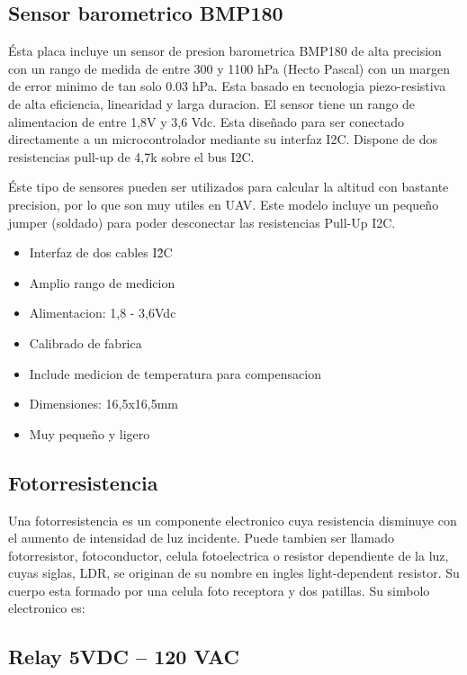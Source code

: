 \documentclass{article}
\begin{document}
\subsection{Sensor barometrico BMP180}

Ésta placa incluye un sensor de presion barometrica BMP180 de alta precision con un rango de medida de entre 300 y 1100 hPa (Hecto Pascal) con un margen de error minimo de tan solo 0.03 hPa. Esta basado en tecnologia piezo-resistiva de alta eficiencia, linearidad y larga duracion. El sensor tiene un rango de alimentacion de entre 1,8V y 3,6 Vdc. Esta diseñado para ser conectado directamente a un microcontrolador mediante su interfaz I2C. Dispone de dos resistencias pull-up de 4,7k sobre el bus I2C.

Éste tipo de sensores pueden ser utilizados para calcular la altitud con bastante precision, por lo que son muy utiles en UAV. Este modelo incluye un pequeño jumper (soldado) para poder desconectar las resistencias Pull-Up I2C.

\begin{itemize}
	\item Interfaz de dos cables I\^2C
	\item Amplio rango de medicion
	\item Alimentacion: 1,8 - 3,6Vdc
	\item Calibrado de fabrica
	\item Include medicion de temperatura para compensacion
	\item Dimensiones: 16,5x16,5mm
	\item Muy pequeño y ligero
\end{itemize}

\subsection{Fotorresistencia}

Una fotorresistencia es un componente electronico cuya resistencia disminuye con el aumento de intensidad de luz incidente. Puede tambien ser llamado fotorresistor, fotoconductor, celula fotoelectrica o resistor dependiente de la luz, cuyas siglas, LDR, se originan de su nombre en ingles light-dependent resistor. Su cuerpo esta formado por una celula foto receptora y dos patillas. Su simbolo electronico es:

\subsection{Relay 5VDC – 120 VAC}
\end{document}
